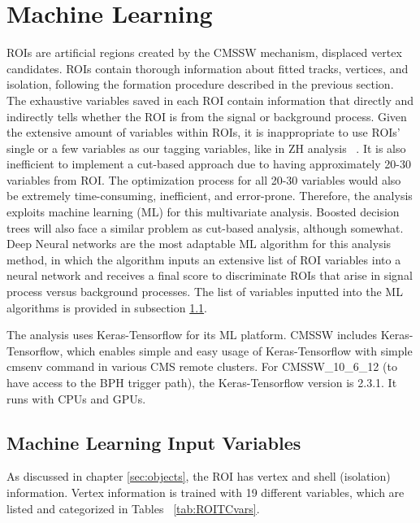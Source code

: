 \clearpage
\chapter{Machine Learning}\label{sec:machinelearning}
ROIs are artificial regions created by the CMSSW mechanism, displaced vertex candidates.
ROIs contain thorough information about fitted tracks, vertices, and isolation, following the formation procedure described in the previous section.
The exhaustive variables saved in each ROI contain information that directly and indirectly tells whether the ROI is from the signal or background process.
Given the extensive amount of variables within ROIs, it is inappropriate to use ROIs' single or a few variables as our tagging variables, like in ZH analysis ~\cite{ZHAN}.
It is also inefficient to implement a cut-based approach due to having approximately 20-30 variables from ROI.
The optimization process for all 20-30 variables would also be extremely time-consuming, inefficient, and error-prone.
Therefore, the analysis exploits machine learning (ML) for this multivariate analysis.
Boosted decision trees will also face a similar problem as cut-based analysis, although somewhat.
Deep Neural networks are the most adaptable ML algorithm for this analysis method, in which the algorithm inputs an extensive list of ROI variables into a neural network and receives a final score to discriminate ROIs that arise in signal process versus background processes.
The list of variables inputted into the ML algorithms is provided in subsection \ref{sec:MLIV}.

The analysis uses Keras-Tensorflow for its ML platform.
CMSSW includes Keras-Tensorflow, which enables simple and easy usage of Keras-Tensorflow with simple cmsenv command in various CMS remote clusters.
For CMSSW\_10\_6\_12 (to have access to the BPH trigger path), the Keras-Tensorflow version is 2.3.1.
It runs with CPUs and GPUs.
\section{Machine Learning Input Variables}\label{sec:MLIV}
As discussed in chapter \ref{sec:objects}, the ROI has vertex and shell (isolation) information.
Vertex information is trained with 19 different variables, which are listed and categorized in Tables ~\ref{tab:ROITCvars}.

